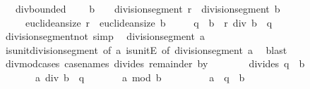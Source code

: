 \begin{isabellebody}
\ \ \ div{\isacharunderscore}{\kern0pt}bounded{\isacharcolon}{\kern0pt}\isanewline
\ \ \ \ {\isachardoublequoteopen}b\ {\isasymnoteq}\ {}\ {\isasymLongrightarrow}\ division{\isacharunderscore}{\kern0pt}segment\ r\ {\isacharequal}{\kern0pt}\ division{\isacharunderscore}{\kern0pt}segment\ b\isanewline
\ \ \ \ {\isasymLongrightarrow}\ euclidean{\isacharunderscore}{\kern0pt}size\ r\ {\isacharless}{\kern0pt}\ euclidean{\isacharunderscore}{\kern0pt}size\ b\isanewline
\ \ \ \ {\isasymLongrightarrow}\ {\isacharparenleft}{\kern0pt}q\ {\isacharasterisk}{\kern0pt}\ b\ {\isacharplus}{\kern0pt}\ r{\isacharparenright}{\kern0pt}\ div\ b\ {\isacharequal}{\kern0pt}\ q{\isachardoublequoteclose}\isanewline
{}\isanewline
\isanewline
{}\isamarkupfalse%
\ division{\isacharunderscore}{\kern0pt}segment{\isacharunderscore}{\kern0pt}not{\isacharunderscore}{\kern0pt}{}\ {\isacharbrackleft}{\kern0pt}simp{\isacharbrackright}{\kern0pt}{\isacharcolon}{\kern0pt}\isanewline
\ \ {\isachardoublequoteopen}division{\isacharunderscore}{\kern0pt}segment\ a\ {\isasymnoteq}\ {}{\isachardoublequoteclose}\isanewline
%
\isadelimproof
\ \ %
\endisadelimproof
%
\isatagproof
{}\isamarkupfalse%
\ is{\isacharunderscore}{\kern0pt}unit{\isacharunderscore}{\kern0pt}division{\isacharunderscore}{\kern0pt}segment\ {\isacharbrackleft}{\kern0pt}of\ a{\isacharbrackright}{\kern0pt}\ is{\isacharunderscore}{\kern0pt}unitE\ {\isacharbrackleft}{\kern0pt}of\ {\isachardoublequoteopen}division{\isacharunderscore}{\kern0pt}segment\ a{\isachardoublequoteclose}{\isacharbrackright}{\kern0pt}\ \isamarkupfalse%
\ blast%
\endisatagproof
{\isafoldproof}%
%
\isadelimproof
\isanewline
%
\endisadelimproof
\isanewline
{}\isamarkupfalse%
\ divmod{\isacharunderscore}{\kern0pt}cases\ {\isacharbrackleft}{\kern0pt}case{\isacharunderscore}{\kern0pt}names\ divides\ remainder\ by{}{\isacharbrackright}{\kern0pt}{\isacharcolon}{\kern0pt}\isanewline
\ \ \ \isanewline
\ \ \ \ {\isacharparenleft}{\kern0pt}divides{\isacharparenright}{\kern0pt}\ q\ \ {\isachardoublequoteopen}b\ {\isasymnoteq}\ {}{\isachardoublequoteclose}\isanewline
\ \ \ \ \ \ \ {\isachardoublequoteopen}a\ div\ b\ {\isacharequal}{\kern0pt}\ q{\isachardoublequoteclose}\isanewline
\ \ \ \ \ \ \ {\isachardoublequoteopen}a\ mod\ b\ {\isacharequal}{\kern0pt}\ {}{\isachardoublequoteclose}\isanewline
\ \ \ \ \ \ \ {\isachardoublequoteopen}a\ {\isacharequal}{\kern0pt}\ q\ {\isacharasterisk}{\kern0pt}\ b{\isachardoublequoteclose}\isanewline

\end{isabellebody}
